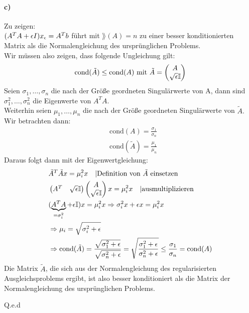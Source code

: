 \paragraph*{c)}
Zu zeigen:\\
$(A^TA + \epsilon I)x_\epsilon = A^Tb$ führt mit $\rang(A) = n$ zu einer besser konditionierten Matrix als die Normalengleichung des ursprünglichen Problems.\\
\newline
Wir müssen also zeigen, dass folgende Ungleichung gilt:
\begin{align*}
\text{cond}(\tilde{A})\le \text{cond}(A) \text{ mit } \tilde{A}=\begin{pmatrix}
A\\\sqrt{\epsilon}\mathbb{I}
\end{pmatrix}
\end{align*}
Seien $\sigma_1,\ldots,\sigma_n$ die nach der Größe geordneten Singulärwerte von A, dann sind  $\sigma_1^{2},\ldots,\sigma_n^{2}$ die Eigenwerte von $A^TA$.\\ Weiterhin seien $\mu_1,\ldots,\mu_n$ die nach der Größe geordneten Singulärwerte von $\tilde{A}.$
Wir betrachten dann:
\begin{align*}
&\text{cond}(A)=\frac{\sigma_1}{\sigma_n}\\
&\text{cond}(\tilde{A})=\frac{\mu_1}{\mu_n}
\end{align*}
Daraus folgt dann mit der Eigenwertgleichung:
\begin{align*}
&\tilde{A}^{T}\tilde{A}x=\mu_i^{2}x \quad |\text{Definition von $\tilde{A}$ einsetzen}\\
&\begin{pmatrix}
A^T&\sqrt{\epsilon}\mathbb{I}
\end{pmatrix}
\begin{pmatrix}
A\\\sqrt{\epsilon}\mathbb{I} 
\end{pmatrix}x=\mu_i^{2}x\quad |\text{ausmultiplizieren}\\
&(\underbrace{A^TA}_{=\sigma_i^{2}}+\epsilon\mathbb{I})x=\mu_i^2x \Rightarrow \sigma_i^{2}x+\epsilon x = \mu_i^{2}x\\
&\Rightarrow \mu_i=\sqrt{\sigma_i^{2}+\epsilon}\\
&\Rightarrow \text{cond}(\tilde{A})= \frac{\sqrt{\sigma_1^{2}+\epsilon}}{\sqrt{\sigma_n^{2}+\epsilon}}=\sqrt{\frac{\sigma_1^{2}+\epsilon}{\sigma_n^{2}+\epsilon}} \le \frac{\sigma_1}{\sigma_n}=\text{cond}(A)
\end{align*}
Die Matrix $\tilde{A}$, die sich aus der Normalengleichung des regularisierten Ausgleichsproblems ergibt, ist also besser konditioniert als die Matrix der Normalengleichung des ursprünglichen Problems.
\begin{flushright}
	Q.e.d
\end{flushright}

